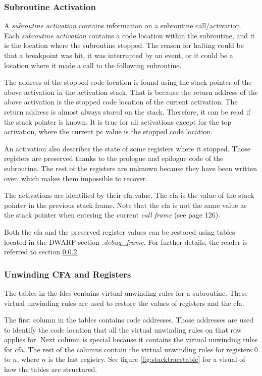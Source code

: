 \subsubsection{Subroutine Activation} \label{sec:subact}
A \emph{subroutine activation} contains information on a subroutine call/activation.
Each \emph{subroutine activation} contains a code location within the subroutine, and it is the location where the subroutine stopped.
The reason for halting could be that a breakpoint was hit, it was interrupted by an event, or it could be a location where it made a call to the following subroutine.


The address of the stopped code location is found using the stack pointer of the above activation in the activation stack.
That is because the return address of the above activation is the stopped code location of the current activation.
The return address is almost always stored on the stack.
Therefore, it can be read if the stack pointer is known.
It is true for all activations except for the top activation, where the current \gls{pc} value is the stopped code location.


An activation also describes the state of some registers where it stopped.
Those registers are preserved thanks to the prologue and epilogue code of the subroutine.
The rest of the registers are unknown because they have been written over, which makes them impossible to recover.


The activations are identified by their \gls{cfa} value.
The \gls{cfa} is the value of the stack pointer in the previous stack frame.
Note that the \gls{cfa} is not the same value as the stack pointer when entering the current \emph{call frame} (see \cite{dwarf} page 126).


Both the \gls{cfa} and the preserved register values can be restored using tables located in the \gls{DWARF} section \emph{.debug\_frame}.
For further details, the reader is referred to section \ref{sec:evalcfa}.


\subsubsection{Unwinding CFA and Registers} \label{sec:evalcfa}
The tables in the \glspl{fde} contains virtual unwinding rules for a subroutine.
These virtual unwinding rules are used to restore the values of registers and the \gls{cfa}.


The first column in the tables contains code addresses.
Those addresses are used to identify the code location that all the virtual unwinding rules on that row applies for.
Next column is special because it contains the virtual unwinding rules for \gls{cfa}.
The rest of the columns contain the virtual unwinding rules for registers $0$ to $n$, where $n$ is the last registry.
See figure \ref{fig:stacktracetable} for a visual of how the tables are structured.



